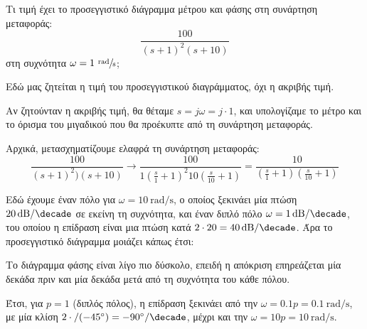 \documentclass[11pt,a4paper,notitlepage,fleqn]{article}
\begin{document}
\begin{exercise}
Τι τιμή έχει το προσεγγιστικό διάγραμμα μέτρου και φάσης στη συνάρτηση μεταφοράς:
\[ \displaystyle \frac{100}{(s+1)^2(s+10)} \] στη συχνότητα \( \omega = 1\ \sfrac{\mathrm{rad}}{\mathrm{s}} \);
\tcblower
\begin{attnbox}{}
	Εδώ μας ζητείται η τιμή του προσεγγιστικού διαγράμματος, όχι η ακριβής τιμή.
\end{attnbox}
Αν ζητούνταν η ακριβής τιμή, θα θέταμε \( s=j\omega = j\cdot 1 \), και υπολογίζαμε το
μέτρο και το όρισμα του μιγαδικού που θα προέκυπτε από τη συνάρτηση μεταφοράς.

Αρχικά, μετασχηματίζουμε ελαφρά τη συνάρτηση μεταφοράς:
\[
\frac{100}{(s+1)^2)(s+10)}
\xrightarrow{\quad}
\frac{100}{1\left(\frac{s}{1}+1\right)^2 10 \left(\frac{s}{10}+1\right)}
= \frac{10}{\left(\frac{s}{1}+1\right)\left(\frac{s}{10}+1\right)}
\]

Εδώ έχουμε έναν πόλο για \( \omega  = \SI{10}{\radian/\second} \), ο οποίος ξεκινάει μία
πτώση \( \SI{20}{\decibel/\decade} \) σε εκείνη τη συχνότητα, και έναν διπλό πόλο
\( \omega  = \SI{1}{\decibel/\decade} \), του οποίου η επίδραση είναι μια πτώση κατά
\( 2\cdot20 = \SI{40}{\decibel/\decade} \). Άρα το προσεγγιστικό διάγραμμα μοιάζει κάπως έτσι:


Το διάγραμμα φάσης είναι λίγο πιο δύσκολο, επειδή η απόκριση επηρεάζεται μία δεκάδα πριν
και μία δεκάδα μετά από τη συχνότητα του κάθε πόλου.

Έτσι, για \( p=1 \) (διπλός πόλος), η επίδραση ξεκινάει από την \( \omega = 0.1p =
\SI{0.1}{\radian/\second}  \), με μία κλίση \( 2\cdot/(\ang{-45}) = \ang{-90}/\si{\decade} \),
μέχρι και την \( \omega = 10p = \SI{10}{\radian/\second} \).


\end{exercise}
\end{document}
